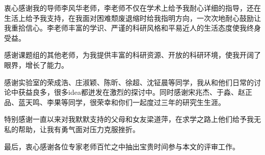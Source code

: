 
\begin{acknowledgements}
  衷心感谢我的导师李风华老师，李老师不仅在学术上给予我耐心详细的指导，还在生活上给予我支持，在我面对困难颓废退缩时给我指明方向，一次次地耐心鼓励让我重拾信心。李老师丰富的学识、严谨的科研风格和平易近人的生活态度使我终身受益。

  感谢课题组的其他老师，为我提供丰富的科研资源、开放的科研环境，使我开阔了眼界，增长了能力。

  感谢实验室的荣成浩、庄淑颖、陈昕、徐超、沈钲晨等同学，我从和他们日常的讨论中获益良多，很多idea都迸发在激烈的探讨中。同时感谢宋兆杰、于淼、赵正品、蓝天鸣、李果等同学，很荣幸和你们一起度过三年的研究生生涯。


  特别感谢一直以来对我默默支持的父母和女友梁道萍，在求学之路上他们给予我无私的帮助，让我有勇气面对压力克服挫折。

  最后，衷心感谢各位专家老师百忙之中抽出宝贵时间参与本文的评审工作。

\end{acknowledgements}
